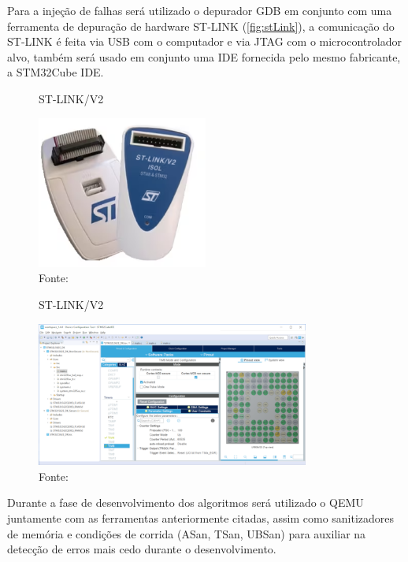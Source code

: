 Para a injeção de falhas será utilizado o depurador GDB em conjunto com uma ferramenta de depuração de hardware ST-LINK (\autoref{fig:stLink}), a comunicação do ST-LINK é feita via USB com o computador e via JTAG com o microcontrolador alvo, também será usado em conjunto uma IDE fornecida pelo mesmo fabricante, a STM32Cube IDE.

\begin{figure}[H]
    \centering
    \captionsetup{justification=centering}
    \caption{ST-LINK/V2}
    \includegraphics[width=0.50\textwidth]{assets/st_link.png}
    \captionsetup{justification=raggedright}
    \caption*{Fonte: }
    \label{fig:stLink}
\end{figure}

\begin{figure}[H]
    \centering
    \captionsetup{justification=centering}
    \caption{ST-LINK/V2}
    \includegraphics[width=0.80\textwidth]{assets/stmcube_ide.png}
    \captionsetup{justification=raggedright}
    \caption*{Fonte: }
    \label{fig:stmCubeIDE}
\end{figure}

Durante a fase de desenvolvimento dos algoritmos será utilizado o QEMU juntamente com as ferramentas anteriormente citadas, assim como sanitizadores de memória e condições de corrida (ASan, TSan, UBSan) para auxiliar na detecção de erros mais cedo durante o desenvolvimento.

